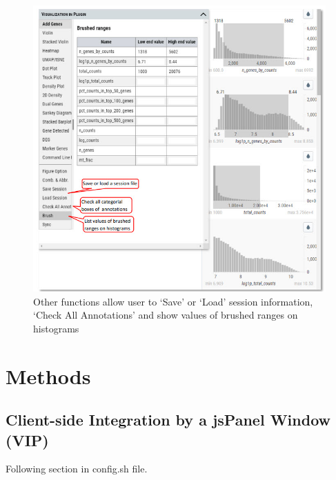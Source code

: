 \documentclass[
]{article}
\begin{document}
\begin{figure}
\centering
\includegraphics{figures/F23.jpg}
\caption{Other functions allow user to `Save' or `Load' session information, `Check All Annotations' and show values of brushed ranges on histograms}
\end{figure}

\hypertarget{methods}{%
\section{Methods}\label{methods}}

\hypertarget{client-side-integration-by-a-jspanel-window-vip}{%
\subsection*{Client-side Integration by a jsPanel Window (VIP)}\label{client-side-integration-by-a-jspanel-window-vip}}

Following section in config.sh file.
\end{document}
